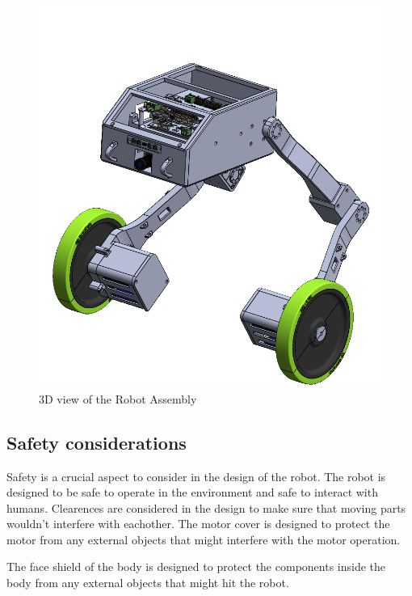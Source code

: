 \begin{figure}[h]
	\centering
	\includegraphics[width=1\linewidth]{Robot_Assembly_3}
	\caption[3D view of the Robot Assembly]{3D view of the Robot Assembly}
	\label{fig:robotassembly3}
\end{figure}

\subsection{Safety considerations}
Safety is a crucial aspect to consider in the design of the robot.
The robot is designed to be safe to operate in the environment and safe to interact with humans. Clearences are considered in the design to make sure that moving parts wouldn't interfere with eachother.
The motor cover is designed to protect the motor from any external objects that might interfere with the motor operation.

The face shield of the body is designed to protect the components inside the body from any external objects that might hit the robot.



